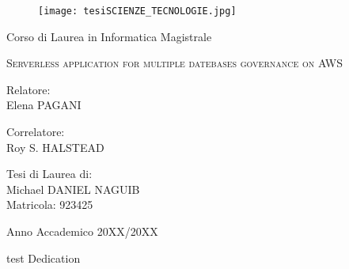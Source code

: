 \documentclass[11pt,a4paper,twoside,
openright]{book}
\newenvironment{dedication}
  {
   \thispagestyle{empty}%
   \vspace*{\stretch{1}}%
   \itshape             %
   \raggedleft          %
  }
  {\par %
   \vspace{\stretch{3}} %
   \clearpage           %
  }
\begin{document}
\begin{titlepage}
	
	\begin{figure}
		\centering
		\texttt{[image: tesiSCIENZE\_TECNOLOGIE.jpg]}
		\vspace{0.5 cm}
	\end{figure}
	

\begin{center}
{\LARGE Corso di Laurea in Informatica Magistrale}
\end{center}

\begin{center}
\vspace{3 cm}
{\Large \textsc{Serverless application for multiple datebases governance on AWS} }
\end{center}
\par
  \vspace{3 cm}
  
  \begin{flushleft}
  		 Relatore:\\ Elena PAGANI
		 
  		 \noindent Correlatore:\\ Roy S. HALSTEAD
  \end{flushleft}
  \vspace{1 cm}
  \begin{flushright}
  	Tesi di Laurea di:\\ Michael DANIEL NAGUIB\\ Matricola: 923425
  \end{flushright}
    	  
\vfill
\begin{center}
	{\large Anno Accademico 20XX/20XX}
\end{center}
\end{titlepage}


\begin{dedication}
test Dedication
\end{dedication}

\tableofcontents 







\end{document}
